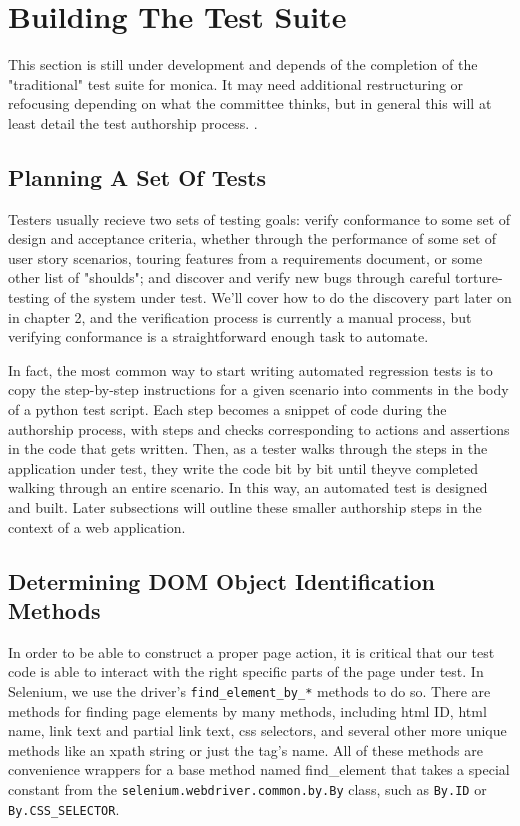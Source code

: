 \section{Building The Test Suite}
This section is still under development and depends of the completion of the "traditional" test suite for monica. It may need additional restructuring or refocusing depending on what the committee thinks, but in general this will at least detail the test authorship process. \citep{GitHubma29}. %

\subsection{Planning A Set Of Tests}
Testers usually recieve two sets of testing goals: verify conformance to some set of design and acceptance criteria, whether through the performance of some set of user story scenarios, touring features from a requirements document, or some other list of "shoulds"; and discover and verify new bugs through careful torture-testing of the system under test. We'll cover how to do the discovery part later on in chapter 2, and the verification process is currently a manual process, but verifying conformance is a straightforward enough task to automate.

In fact, the most common way to start writing automated regression tests is to copy the step-by-step instructions for a given scenario into comments in the body of a python test script. Each step becomes a snippet of code during the authorship process, with steps and checks corresponding to actions and assertions in the code that gets written. Then, as a tester walks through the steps in the application under test, they write the code bit by bit until theyve completed walking through an entire scenario. In this way, an automated test is designed and built. \citep{nguyen2001testing} Later subsections will outline these smaller authorship steps in the context of a web application.

\subsection{Determining DOM Object Identification Methods}
In order to be able to construct a proper page action, it is critical that our test code is able to interact with the right specific parts of the page under test. In Selenium, we use the driver's \texttt{find\_element\_by\_*} methods to do so. There are methods for finding page elements by many methods, including html ID, html name, link text and partial link text, css selectors, and several other more unique methods like an xpath string or just the tag's name. All of these methods are convenience wrappers for a base method named find\_element that takes a special constant from the \texttt{selenium.webdriver.common.by.By} class, such as \texttt{By.ID} or \texttt{By.CSS\_SELECTOR}.

